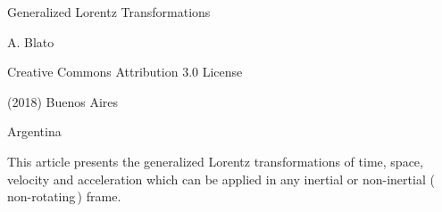 \documentclass[10pt,fleqn]{article}
\begin{document}
\begin{center}

{\fontsize{10.92}{10.92}\selectfont \sc Generalized Lorentz Transformations}

\bigskip \medskip

{\fontsize{9.60}{9.60}\selectfont A. Blato}

\bigskip \medskip

\small

Creative Commons Attribution 3.0 License

\smallskip

(2018) Buenos Aires

\medskip

Argentina

\smallskip

\bigskip \medskip

\parbox{84.00mm}{This article presents the generalized Lorentz transformations of time, space, velocity and acceleration which can be applied in any inertial or non-inertial (\,non-rotating\,) frame.}

\end{center}

\normalsize

\vspace{-1.20em}

\par {}

\bigskip \smallskip
\end{document}
